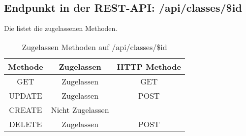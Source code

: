 \subsection{Endpunkt in der REST-API: /api/classes/\$id}
Die  listet die zugelassenen Methoden. 

\begin{table}[!htbp]
	\begin{tabular}{|c|c|c|}
		\hline
			\textbf{Methode} & \textbf{Zugelassen} & \textbf{HTTP Methode} \\ \hline
			GET & Zugelassen & GET \\ \hline
			UPDATE & Zugelassen & POST \\ \hline 
			CREATE & Nicht Zugelassen & \\ \hline 
			DELETE & Zugelassen & POST \\ \hline
	\end{tabular}

		\caption{Zugelassen Methoden auf /api/classes/\$id}
		\label{tab:end:rest:api:classes:id:meth}
\end{table}